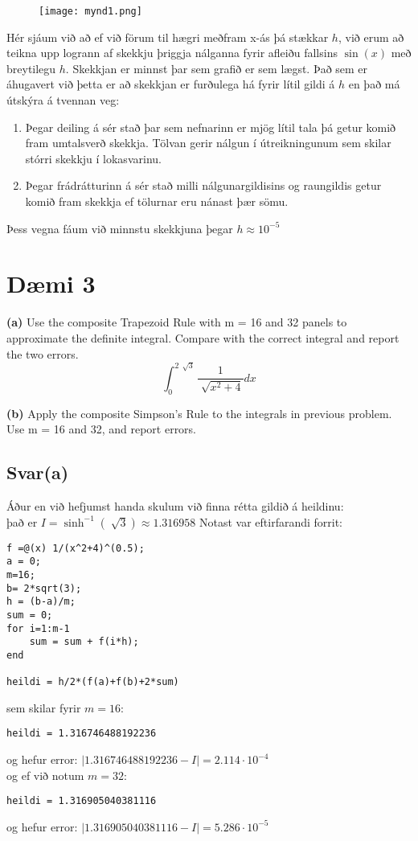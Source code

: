 \documentclass[11pt]{article}
\begin{document}
\begin{figure}[H]
\texttt{[image: mynd1.png]}
\end{figure}
Hér sjáum við að ef við förum til hægri meðfram x-ás þá stækkar $h$, við erum að teikna upp logrann af skekkju þriggja nálganna fyrir afleiðu fallsins $\sin(x)$ með breytilegu $h$. Skekkjan er minnst þar sem grafið er sem lægst. Það sem er áhugavert við þetta er að skekkjan er furðulega há fyrir lítil gildi á $h$ en það má útskýra á tvennan veg:
\begin{enumerate}
\item Þegar deiling á sér stað þar sem nefnarinn er mjög lítil tala þá getur komið fram umtalsverð skekkja. Tölvan gerir nálgun í útreikningunum sem skilar stórri skekkju í lokasvarinu.
\item Þegar frádrátturinn á sér stað milli nálgunargildisins og raungildis getur komið fram skekkja ef tölurnar eru nánast þær sömu.
\end{enumerate}
Þess vegna fáum við minnstu skekkjuna þegar $h\approx 10^{-5}$


\newpage
\section*{Dæmi 3}
\textbf{(a)} Use the composite Trapezoid Rule with m = 16 and 32 panels to approximate the definite
integral. Compare with the correct integral and report the two errors.\\
$$\int_0^{2\,\sqrt[]{3}}\frac{1}{\sqrt[]{x^2+4}} dx $$

\textbf{(b)}
Apply the composite Simpson’s Rule to the integrals in previous problem. Use m = 16 and 32, and report errors.


\subsection*{Svar(a)}
Áður en við hefjumst handa skulum við finna rétta gildið á heildinu:\\
það er $I=\sinh^{-1}(\sqrt[]{3}) \approx 1.316958$
Notast var eftirfarandi forrit:
\begin{verbatim}
f =@(x) 1/(x^2+4)^(0.5);
a = 0;
m=16;
b= 2*sqrt(3);
h = (b-a)/m;
sum = 0;
for i=1:m-1
    sum = sum + f(i*h);
end

heildi = h/2*(f(a)+f(b)+2*sum)
\end{verbatim}
sem skilar fyrir $m=16$:
\begin{verbatim}
heildi = 1.316746488192236
\end{verbatim}
og hefur error: $|1.316746488192236 - I| = 2.114\cdot 10^{-4}$\\
og ef við notum $m=32$:
\begin{verbatim}
heildi = 1.316905040381116
\end{verbatim}
og hefur error: $|1.316905040381116 - I| = 5.286\cdot 10^{-5}$
\end{document}
